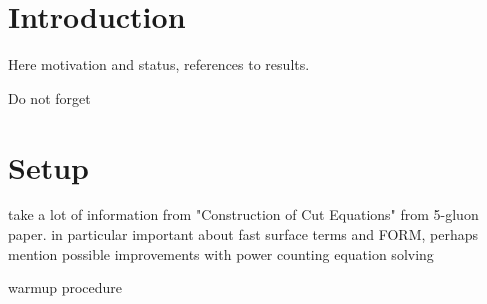 \section{Introduction}
Here motivation and status, references to results.

Do not forget 

\section{Setup}


take a lot of information from "Construction of Cut Equations" from 5-gluon paper.
in particular important about fast surface terms and FORM,
perhaps mention possible improvements with power counting equation solving

warmup procedure



